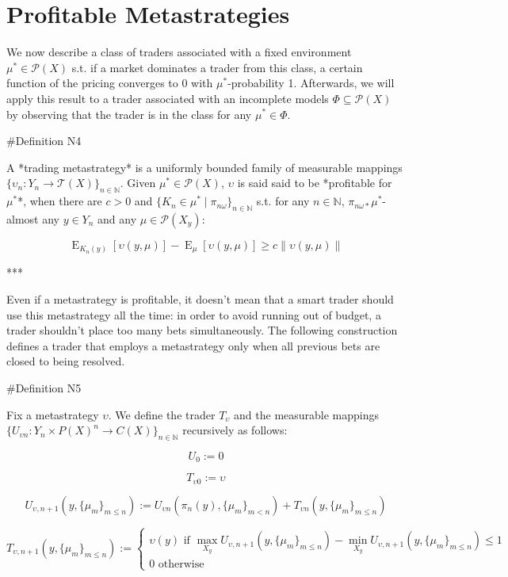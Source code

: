 \documentclass[a4paper]{article}
\DeclareMathOperator{\E}{E}
\newcommand{\Nats}{\mathbb{N}}
\newcommand{\Norm}[1]{\lVert #1 \rVert}
\newcommand{\Prob}{\mathcal{P}}
\newcommand{\T}{\mathcal{T}}
\begin{document}
\section{Profitable Metastrategies}

We now describe a class of traders associated with a fixed environment ${\mu^* \in \Prob(X)}$ s.t. if a market dominates a trader from this class, a certain function of the pricing converges to 0 with ${\mu^*}$-probability 1. Afterwards, we will apply this result to a trader associated with an incomplete models ${\Phi \subseteq \Prob(X)}$ by observing that the trader is in the class for any ${\mu^* \in \Phi}$.

\#Definition N4

A *trading metastrategy* is a uniformly bounded family of measurable mappings ${\{\upsilon_n: Y_n \rightarrow \T(X)\}_{n \in \Nats}}$. Given ${\mu^* \in \Prob(X)}$, ${\upsilon}$ is said said to be *profitable for ${\mu^*}$*, when there are ${c > 0}$ and ${\{K_n \in \mu^* \mid \pi_{n\omega}\}_{n \in \Nats}}$ s.t. for any ${n \in \Nats}$, ${\pi_{n\omega*}\mu^*}$-almost any ${y \in Y_n}$ and any ${\mu \in \Prob(X_y)}$:

$$\E_{K_n(y)}[\upsilon(y,\mu)] - \E_{\mu}[\upsilon(y,\mu)] \geq c \Norm{\upsilon(y,\mu)}$$

***

Even if a metastrategy is profitable, it doesn't mean that a smart trader should use this metastrategy all the time: in order to avoid running out of budget, a trader shouldn't place too many bets simultaneously. The following construction defines a trader that employs a metastrategy only when all previous bets are closed to being resolved.

\#Definition N5

Fix a metastrategy ${\upsilon}$. We define the trader ${T_\upsilon}$ and the measurable mappings ${\{U_{\upsilon  n}: Y_n \times P(X)^n \rightarrow C(X)\}_{n \in \Nats}}$ recursively as follows:
 
 $$U_0 := 0$$

$$T_{\upsilon0} := \upsilon$$

$$U_{\upsilon,n+1}(y, \{\mu_m\}_{m \leq n}) := U_{\upsilon n}(\pi_n(y), \{\mu_m\}_{m < n}) + T_{\upsilon n}(y, \{\mu_m\}_{m \leq n})$$

$$T_{\upsilon,n+1}(y, \{\mu_m\}_{m \leq n}) := \begin{cases}\upsilon(y) \text{ if } \max_{X_y} U_{\upsilon,n+1}(y,\{\mu_m\}_{m \leq n}) - \min_{X_y} U_{\upsilon,n+1}(y,\{\mu_m\}_{m \leq n})\leq 1\\0 \text{ otherwise}\end{cases}$$
\end{document}
